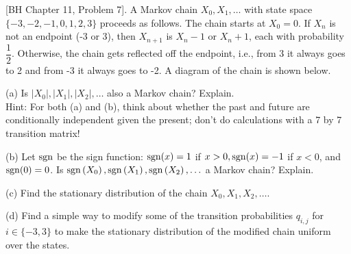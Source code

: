 \begin{homeworkProblem}


[BH Chapter 11, Problem 7]. A Markov chain $X_0, X_1, \ldots$ with state space $\{-3,-2,-1,0,1,2,3\}$ proceeds as follows. The chain starts at $X_0=0$. If $X_n$ is not an endpoint (-3 or 3), then $X_{n+1}$ is $X_n-1$ or $X_n+1$, each with probability $\dfrac{1}{2}$. Otherwise, the chain gets reflected off the endpoint, i.e., from 3 it always goes to 2 and from -3 it always goes to -2. A diagram of the chain is shown below.
\begin{center}
\end{center}

(a) Is $\left|X_0\right|,\left|X_1\right|,\left|X_2\right|, \ldots$ also a Markov chain? Explain. \\
Hint: For both (a) and (b), think about whether the past and future are conditionally independent given the present; don't do calculations with a 7 by 7 transition matrix!

(b) Let $\operatorname{sgn}$ be the sign function: $\operatorname{sgn}(x)=1$ if $x>0, \operatorname{sgn}(x)=-1$ if $x<0$, and $\operatorname{sgn}(0)=0$. Is $\operatorname{sgn}\left(X_0\right), \operatorname{sgn}\left(X_1\right), \operatorname{sgn}\left(X_2\right), \ldots$ a Markov chain? Explain.

(c) Find the stationary distribution of the chain $X_0, X_1, X_2, \ldots$.

(d) Find a simple way to modify some of the transition probabilities $q_{i,j}$ for $i \in\{-3,3\}$ to make the stationary distribution of the modified chain uniform over the states.

\solution


\end{homeworkProblem}
